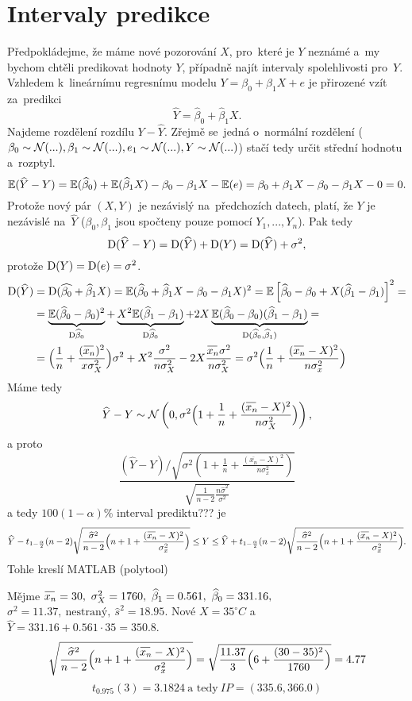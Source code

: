 \section{Intervaly predikce}
Předpokládejme, že máme nové pozorování $X$, pro~které je $Y$ neznámé a~my bychom chtěli predikovat hodnoty $Y$, případně najít intervaly spolehlivosti pro~$Y$. Vzhledem k~lineárnímu regresnímu modelu $Y=\beta_0+\beta_1 X + e$ je přirozené vzít za~predikci
$$\widehat{Y}=\widehat{\beta}_0+\widehat{\beta}_1X .$$
Najdeme rozdělení rozdílu $Y-\widehat{Y}$. Zřejmě se~jedná o~normální rozdělení ($\beta_0\sim \mathcal{N}(...),\\ \beta_1 \sim \mathcal{N}(...),e_1 \sim \mathcal{N}(...), Y \sim \mathcal{N}(...)$) stačí tedy určit střední hodnotu a~rozptyl.
$$\mathbb{E}(\widehat{Y}-Y)=\mathbb{E}(\widehat{\beta}_0)+\mathbb{E}(\widehat{\beta}_1X)-\beta_0-\beta_1 X-\mathbb{E}(e)=\beta_0+\beta_1 X-\beta_0-\beta_1 X -0=0. $$
Protože nový pár $(X,Y)$ je nezávislý na~předchozích datech, platí, že $Y$ je nezávislé na~$\widehat{Y}$ ($\beta_0,\beta_1$ jsou spočteny pouze pomocí $Y_1,...,Y_n$). Pak tedy
$$\mathrm{D} (\widehat{Y}-Y)=\mathrm{D} (\widehat{Y})+\mathrm{D} (Y)=\mathrm{D} (\widehat{Y})+\sigma^2,$$
protože $\mathrm{D} (Y)=\mathrm{D} (e)=\sigma^2$.
\[
\begin{split}
\D (\widehat{Y})&=\D (\widehat{\beta_0}+\widehat{\beta}_1X)=\E(\widehat{\beta}_0+\widehat{\beta}_1X-\beta_0-\beta_1 X)^2=\EE{\widehat{\beta}_0-\beta_0+X(\widehat{\beta}_1-\beta_1)}^2=\\
&=\underbrace{\E(\widehat{\beta}_0-\beta_0)^2}_{\D \widehat{\beta}_0}+\underbrace{X^2\E(\widehat{\beta}_1-\beta_1)}_{\D \widehat{\beta}_0}+2X\underbrace{\E(\widehat{\beta}_0-\beta_0)(\widehat{\beta}_1-\beta_1)}_{\D(\widehat{\beta}_0,\widehat{\beta}_1)}=\\
&=\Br{\frac{1}{n}+\frac{(\oxnn)^2}{x\sigma_X^2}}\sigma^2+X^2\frac{\sigma^2}{n\sigma_X^2}-2X\frac{\oxnn\sigma^2}{n\sigma_X^2}=\sigma^2\Br{\frac{1}{n}+\frac{(\oxnn-X)^2}{n\sigma_x^2}}
\end{split}
\]
Máme tedy
$$\widehat{Y}-Y \sim \n{0, \sigma^2\Br{1+\frac{1}{n}+\frac{(\oxnn-X)^2}{n\sigma_X^2}} },$$
a proto
$$ \frac{{(\widehat{Y}-Y)}\Big/{\sqrt{\sigma^2(1+\frac{1}{n}+\frac{(\overline{x_n}-X)^2}{n\sigma_x^2})}}}{\sqrt{\frac{1}{n-2}\frac{n\widehat{\sigma}^2}{\sigma^2}}}$$
a tedy $100(1-\alpha)$\% interval prediktu??? je
$$\widehat{Y}-t_{1-\frac{\alpha}{2}}(n-2)\sqrt{\frac{\widehat{\sigma}^2}{n-2}\Br{n+1+\frac{(\oxnn-X)^2}{\sigma_x^2}}} \leq Y \leq \widehat{Y}+t_{1-\frac{\alpha}{2}}(n-2)\sqrt{\frac{\widehat{\sigma}^2}{n-2}\Br{n+1+\frac{(\oxnn-X)^2}{\sigma_x^2}}}.$$
Tohle kreslí MATLAB (polytool)
\begin{example}Mějme 
$\oxnn=30, ~\sigma_X^2=1760,~\widehat{\beta}_1=0.561,~\widehat{\beta}_0=331.16,~$\\$\sigma^2=11.37,~ \text{nestraný},~\widehat{s}^2=18.95$.
Nové $X=35^\circ C$ a~$\widehat{Y}=331.16+0.561\cdot 35=350.8$.
$$\sqrt{\frac{\widehat{\sigma}^2}{n-2}\Br{n+1+\frac{(\oxnn-X)^2}{\sigma_x^2}}}=\sqrt{\frac{11.37}{3}\Br{6+\frac{(30-35)^2}{1760}}}=4.77 $$
$$t_{0.975}(3)=3.1824 ~ \text{a tedy}~IP=(335.6,366.0)$$
\end{example}



